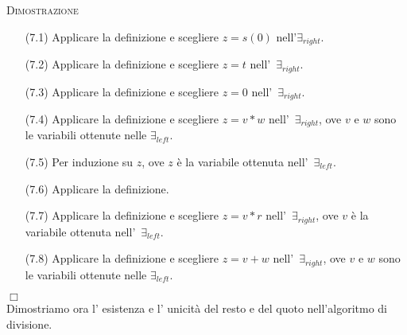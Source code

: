 \vspace{.5cm}
\textsc{Dimostrazione}
\begin{enumerate}
  \item[(7.1)] Applicare la definizione e scegliere $z=s(0)$ nell'$\exists_{right}$.
  \vspace{.5cm}
  \item[(7.2)] Applicare la definizione e scegliere $z=t$ nell'\ $\exists_{right}$.
  \vspace{.5cm}
  \item[(7.3)] Applicare la definizione e scegliere $z=0$ nell'\ $\exists_{right}$.
  \vspace{.5cm}
  \item[(7.4)] Applicare la definizione e scegliere $z=v*w$ nell'\ $\exists_{right}$, ove $v$ e $w$ sono le variabili ottenute nelle $\exists_{left}$.
  \vspace{.5cm}
  \item[(7.5)] Per induzione su $z$, ove $z$ \`e la variabile ottenuta nell'\ $\exists_{left}$.
  \vspace{.5cm}
  \item[(7.6)] Applicare la definizione.
  \vspace{.5cm}
  \item[(7.7)] Applicare la definizione e scegliere $z=v*r$ nell'\ $\exists_{right}$, ove $v$ \`e la variabile ottenuta nell'\ $\exists_{left}$.
  \vspace{.5cm}
  \item[(7.8)] Applicare la definizione e scegliere $z=v+w$ nell'\ $\exists_{right}$, ove $v$ e $w$ sono le variabili ottenute nelle $\exists_{left}$.
\end{enumerate}
 $\Box$\\

\vspace{.5cm}
Dimostriamo ora l' esistenza e l' unicit\`a del resto e del quoto nell'algoritmo di divisione.

